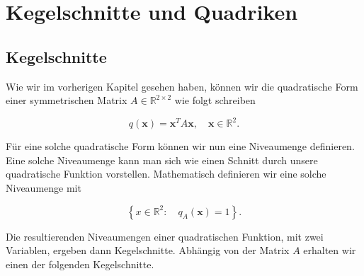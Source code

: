 \setcounter{section}{7}
\section{Kegelschnitte und Quadriken}

\subsection{Kegelschnitte}

Wie wir im vorherigen Kapitel gesehen haben, können wir die quadratische Form einer symmetrischen Matrix \( A \in \mathbb{R}^{2 \times 2} \) wie folgt schreiben

\begin{equation*}
    q(\mathbf{x}) = \mathbf{x}^T A \mathbf{x}, \quad \mathbf{x} \in \mathbb{R}^2.
\end{equation*}

Für eine solche quadratische Form können wir nun eine Niveaumenge definieren. Eine solche Niveaumenge kann man sich wie einen Schnitt durch unsere quadratische Funktion vorstellen. Mathematisch definieren wir eine solche Niveaumenge mit

\begin{equation*}
    \left\{x \in \mathbb{R}^2: \quad q_A(\mathbf{x}) = 1 \right\}.
\end{equation*}

Die resultierenden Niveaumengen einer quadratischen Funktion, mit zwei Variablen, ergeben dann Kegelschnitte. Abhängig von der Matrix \( A \)  erhalten wir einen der folgenden Kegelschnitte. 

\vspace{\baselineskip}

\begin{figure}[h]
    \centering
\end{figure}

